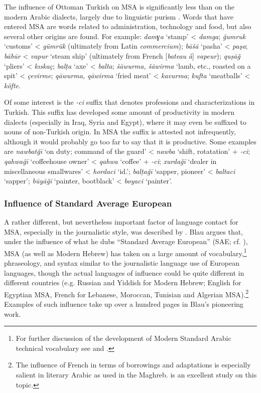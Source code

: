 \documentclass[output=paper]{langsci/langscibook}
\begin{document}
The influence of Ottoman Turkish on MSA is significantly less than on the modern Arabic dialects, largely due to linguistic purism \citep{Procházka2011Turkish}. Words that have entered MSA are words related to administration, technology and food, but also several other origins are found. For example: \textit{damɣa} ‘stamp’ < \textit{damga}; \textit{ǧumruk} ‘customs’ < \textit{gümrük} (ultimately from Latin \textit{commercium}); \textit{bāšā} ‘pasha’ < \textit{paşa}; \textit{bābūr} < \textit{vapur} ‘steam ship’ (ultimately from French [\textit{bateau} \textit{à}] \textit{vapeur}); \textit{quṣāǧ} ‘pliers’ < \textit{kıskaç}; \textit{balṭa} ‘axe’ < \textit{balta}; \textit{šāwurma,} \textit{šāwirma} ‘lamb, etc., roasted on a spit’ < \textit{çevirme}; \textit{qāwurma,} \textit{qāwirma} ‘fried meat’ < \textit{kavurma}; \textit{kufta} ‘meatballs’ < \textit{köfte}.

Of some interest is the \textit{-ci} suffix that denotes professions and characterizations in Turkish. This suffix has developed some amount of productivity in modern dialects (especially in Iraq, Syria and Egypt), where it may even be suffixed to nouns of non-Turkish origin. In MSA the suffix is attested not infrequently, although it would probably go too far to say that it is productive. Some examples are \textit{nawbatǧī} ‘on duty; command of the guard’ < \textit{nawba} ‘shift, rotatation’ + \textit{-ci}; \textit{qahwaǧī} ‘coffeehouse owner’ < \textit{qahwa} ‘coffee’ + \textit{-ci}; \textit{xurdaǧī} ‘dealer in miscellaneous smallwares’ < \textit{hordaci} ‘id.’; \textit{balṭaǧī} ‘sapper, pioneer’ < \textit{baltaci} ‘sapper’; \textit{būyāǧī} ‘painter, bootblack’ < \textit{boyaci} ‘painter’.

\subsubsection{Influence of Standard Average European}

A rather different, but nevertheless important factor of language contact for MSA, especially in the journalistic style, was described by \citet{Blau1969}. Blau argues that, under the influence of what he dubs “Standard Average European” (SAE; cf. \citealt{Whorf1956}), MSA (as well as Modern Hebrew) has taken on a large amount of vocabulary,\footnote{For further discussion of the development of Modern Standard Arabic technical vocabulary see \citet{Dichy2011} and \citet{Jacquart94}.} phraseology, and syntax similar to the journalistic language use of European languages, though the actual languages of influence could be quite different in different countries (e.g. Russian and Yiddish for Modern Hebrew; English for Egyptian MSA, French for Lebanese, Moroccan, Tunisian and Algerian MSA).\footnote{The influence of French in terms of borrowings and adaptations is especially salient in literary Arabic as used in the Maghreb. \citet{Kropftisch1977} is an excellent study on this topic.} Examples of such influence take up over a hundred pages in Blau’s pioneering work.
\end{document}
